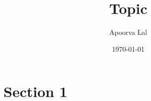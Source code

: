 \documentclass[11pt]{amsart}
\title{Topic}
\author{Apoorva Lal}
\date{\today}
\begin{document}
\maketitle
\section{Section 1}
\end{document}
